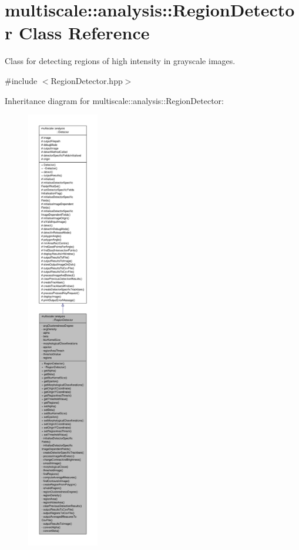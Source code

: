 \hypertarget{classmultiscale_1_1analysis_1_1RegionDetector}{\section{multiscale\-:\-:analysis\-:\-:Region\-Detector Class Reference}
\label{classmultiscale_1_1analysis_1_1RegionDetector}
}


Class for detecting regions of high intensity in grayscale images.  




{\ttfamily \#include $<$Region\-Detector.\-hpp$>$}



Inheritance diagram for multiscale\-:\-:analysis\-:\-:Region\-Detector\-:
\nopagebreak
\begin{figure}[H]
\begin{center}
\leavevmode
\includegraphics[height=550pt]{classmultiscale_1_1analysis_1_1RegionDetector__inherit__graph}
\end{center}
\end{figure}


